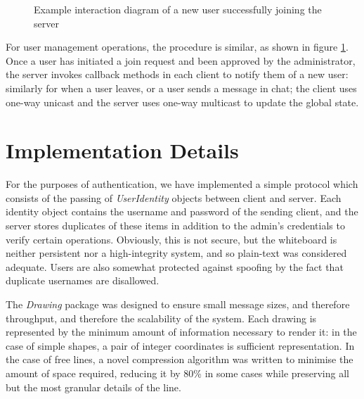 \documentclass[12pt,a4paper]{article}
\begin{document}
\begin{figure}[h]
\caption{Example interaction diagram of a new user successfully joining the server}
\label{fig:join}
\centering
\end{figure}

For user management operations, the procedure is similar, as shown in figure \ref{fig:join}. Once a user has initiated a join request and been approved by the administrator, the server invokes callback methods in each client to notify them of a new user: similarly for when a user leaves, or a user sends a message in chat; the client uses one-way unicast and the server uses one-way multicast to update the global state. 


\section{Implementation Details}

For the purposes of authentication, we have implemented a simple protocol which consists of the passing of \textit{UserIdentity} objects between client and server. Each identity object contains the username and password of the sending client, and the server stores duplicates of these items in addition to the admin's credentials to verify certain operations. Obviously, this is not secure, but the whiteboard is neither persistent nor a high-integrity system, and so plain-text was considered adequate. Users are also somewhat protected against spoofing by the fact that duplicate usernames are disallowed.

The \textit{Drawing} package was designed to ensure small message sizes, and therefore throughput, and therefore the scalability of the system. Each drawing is represented by the minimum amount of information necessary to render it: in the case of simple shapes, a pair of integer coordinates is sufficient representation. In the case of free lines, a novel compression algorithm was written to minimise the amount of space required, reducing it by 80\% in some cases while preserving all but the most granular details of the line. 
\end{document}
